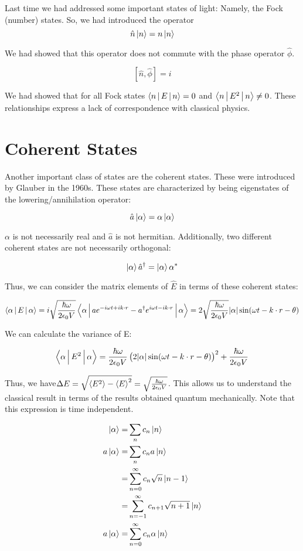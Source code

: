 \documentclass{article}
\begin{document}
Last time we had addressed some important states of light: Namely, the Fock
(number) states. So, we had introduced the operator
\[
   \hat{n} \Ket{n} = n \Ket{n}
\]

We had showed that this operator does not commute with the phase operator $
\hat{\phi} $.

\[
   [ \hat{n} , \hat{\phi} ] = i
\]

We had showed that for all Fock states $ \Braket{n | E | n } = 0 $ and $
\Braket{n | E^2 | n } \ne 0 $. These relationships express a lack of
correspondence with classical physics.

\section{Coherent States}
\label{sec:coherent_states}

Another important class of states are the coherent states. These were introduced
by Glauber in the 1960s. These states are characterized by being eigenstates of
the lowering/annihilation operator:

\[
   \hat{a} \Ket{\alpha} = \alpha \Ket{\alpha}
\]

$ \alpha $ is not necessarily real and $ \hat{a} $ is not hermitian.
Additionally, two different coherent states are not necessarily orthogonal:

\[
   \Ket{\alpha} \hat{a}^\dagger = \Ket{\alpha} \alpha^*
\]

Thus, we can consider the matrix elements of $ \hat{E} $ in terms of these
coherent states:

\[
   \Braket{\alpha | E | \alpha} = i \sqrt{\frac{\hbar \omega}{2 \epsilon_0 V}}
   \Braket{\alpha | a e^{-i \omega t + i k \cdot r} - a^\dagger e^{i \omega t -i
   k \cdot r} | \alpha  } = 2 \sqrt{\frac{\hbar \omega}{2 \epsilon_0 V}} |\alpha|
   \sin(\omega t - k \cdot r - \theta)
\]

We can calculate the variance of E:

\[
   \Braket{\alpha | E^2 | \alpha} = \frac{\hbar \omega}{2 \epsilon_0 V} \left( 2
   |\alpha| \sin(\omega t - k \cdot r - \theta) \right)^2 + \frac{\hbar \omega}{2
   \epsilon_0 V}
\]

Thus, we have$ \Delta E = \sqrt{ \Braket{E^2} - \Braket{E}^2 } =
\sqrt{\frac{\hbar \omega}{2 \epsilon_0 V}}$. This allows us to understand the
classical result in terms of the results obtained quantum mechanically. Note
that this expression is time independent.

\begin{align*}
   \Ket{\alpha} =& \sum_n c_n \Ket{n} \\
   a \Ket{\alpha} =& \sum_n c_n a \Ket{n} \\
   =& \sum_{n=0}^\infty c_n \sqrt{n} \Ket{n-1} \\
   =& \sum_{n=-1}^\infty c_{n+1} \sqrt{n+1} \Ket{n} \\
   a \Ket{\alpha} =& \sum_{n=0}^\infty c_n \alpha \Ket{n}
\end{align*}
\end{document}
